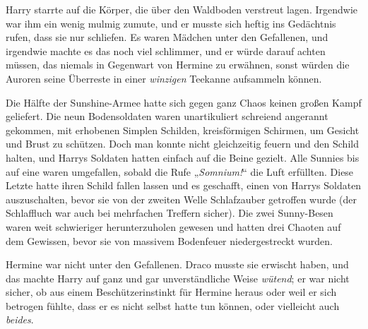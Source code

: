 \later

Harry starrte auf die Körper, die über den Waldboden verstreut lagen. Irgendwie war ihm ein wenig mulmig zumute, und er musste sich heftig ins Gedächtnis rufen, dass sie nur schliefen. Es waren Mädchen unter den Gefallenen, und irgendwie machte es das noch viel schlimmer, und er würde darauf achten müssen, das niemals in Gegenwart von Hermine zu erwähnen, sonst würden die Auroren seine Überreste in einer \emph{winzigen} Teekanne aufsammeln können.

Die Hälfte der Sunshine-Armee hatte sich gegen ganz Chaos keinen großen Kampf geliefert. Die neun Bodensoldaten waren unartikuliert schreiend angerannt gekommen, mit erhobenen Simplen Schilden, kreisförmigen Schirmen, um Gesicht und Brust zu schützen. Doch man konnte nicht gleichzeitig feuern und den Schild halten, und Harrys Soldaten hatten einfach auf die Beine gezielt. Alle Sunnies bis auf eine waren umgefallen, sobald die Rufe „\emph{Somnium!}“ die Luft erfüllten. Diese Letzte hatte ihren Schild fallen lassen und es geschafft, einen von Harrys Soldaten auszuschalten, bevor sie von der zweiten Welle Schlafzauber getroffen wurde (der Schlaffluch war auch bei mehrfachen Treffern sicher). Die zwei Sunny-Besen waren weit schwieriger herunterzuholen gewesen und hatten drei Chaoten auf dem Gewissen, bevor sie von massivem Bodenfeuer niedergestreckt wurden.

Hermine war nicht unter den Gefallenen. Draco musste sie erwischt haben, und das machte Harry auf ganz und gar unverständliche Weise \emph{wütend}; er war nicht sicher, ob aus einem Beschützerinstinkt für Hermine heraus oder weil er sich betrogen fühlte, dass er es nicht selbst hatte tun können, oder vielleicht auch \emph{beides}.

